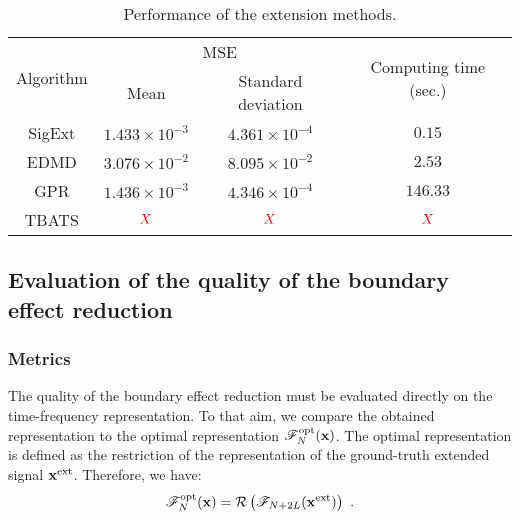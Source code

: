 \begin{table}
\centering
\caption{Performance of the extension methods.}
\begin{tabular}{|c||c|c|c|}
  \hline
   \multirow{2}{*}{Algorithm} & \multicolumn{2}{c|}{MSE}  & \multirow{2}{41pt}{Computing time (sec.)} \\
   \cline{2-3} & Mean & Standard deviation & \\
   \hhline{|=#=|=|=|}
   {\sf SigExt} & $1.433\times 10^{-3}$ & $4.361\times 10^{-4}$ & $0.15$ \\
   \hline
   EDMD & $3.076\times 10^{-2}$ & $8.095\times 10^{-2}$ & $2.53$\\
   \hline
   GPR & $1.436\times 10^{-3}$ & $4.346\times 10^{-4}$ & $146.33$ \\
   \hline
   TBATS & ${\color{red}X}$ & ${\color{red}X}$ & ${\color{red}X}$ \\
   \hline
\end{tabular}
\label{tab:mse.sine}
\end{table} 


\subsection{Evaluation of the quality of the boundary effect reduction}

\subsubsection{Metrics}
The quality of the boundary effect reduction must be evaluated directly on the time-frequency representation. To that aim, we compare the obtained representation to the optimal representation ${\mathscr F}_N^\mathrm{opt}({\mathbf x})$. The optimal representation is defined as the restriction of the representation of the ground-truth extended signal ${\mathbf x}^\mathrm{ext}$. Therefore, we have:
\begin{equation*}
{\mathscr F}_N^\mathrm{opt}({\mathbf x}) = {\mathcal R}\left( {\mathscr F}_{N+2L}({\mathbf x}^\mathrm{ext}) \right) \ .
\end{equation*} 

